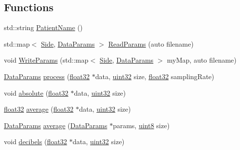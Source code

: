 \subsection*{Functions}
\begin{DoxyCompactItemize}
\item 
std\+::string \hyperlink{namespaceavda_ae20728e7e8ae50bf2f74849e538841ea}{Patient\+Name} ()
\item 
std\+::map$<$ \hyperlink{namespaceavda_af723e82f0d3d45fda6fdc01f6a492786}{Side}, \hyperlink{structDataParams}{Data\+Params} $>$ \hyperlink{namespaceavda_a46dc980b65ddfc24749ce25c1290e158}{Read\+Params} (auto filename)
\item 
void \hyperlink{namespaceavda_aba04a08b41833ced32ec803d55a63bee}{Write\+Params} (std\+::map$<$ \hyperlink{namespaceavda_af723e82f0d3d45fda6fdc01f6a492786}{Side}, \hyperlink{structDataParams}{Data\+Params} $>$ my\+Map, auto filename)
\item 
\hyperlink{structDataParams}{Data\+Params} \hyperlink{namespaceavda_a5196cce27286d08ca144a460caee7839}{process} (\hyperlink{definitions_8hpp_aacdc525d6f7bddb3ae95d5c311bd06a1}{float32} $\ast$data, \hyperlink{definitions_8hpp_a1134b580f8da4de94ca6b1de4d37975e}{uint32} size, \hyperlink{definitions_8hpp_aacdc525d6f7bddb3ae95d5c311bd06a1}{float32} sampling\+Rate)
\item 
void \hyperlink{namespaceavda_aa771d0ed99fc4954c643ea71e91905bf}{absolute} (\hyperlink{definitions_8hpp_aacdc525d6f7bddb3ae95d5c311bd06a1}{float32} $\ast$data, \hyperlink{definitions_8hpp_a1134b580f8da4de94ca6b1de4d37975e}{uint32} size)
\item 
\hyperlink{definitions_8hpp_aacdc525d6f7bddb3ae95d5c311bd06a1}{float32} \hyperlink{namespaceavda_a2a830f24a59aa2538ea82f6e000cce61}{average} (\hyperlink{definitions_8hpp_aacdc525d6f7bddb3ae95d5c311bd06a1}{float32} $\ast$data, \hyperlink{definitions_8hpp_a1134b580f8da4de94ca6b1de4d37975e}{uint32} size)
\item 
\hyperlink{structDataParams}{Data\+Params} \hyperlink{namespaceavda_a87927e04b25012fa7fa0fe05eefce41a}{average} (\hyperlink{structDataParams}{Data\+Params} $\ast$params, \hyperlink{definitions_8hpp_adde6aaee8457bee49c2a92621fe22b79}{uint8} size)
\item 
void \hyperlink{namespaceavda_a9c0b7f832eace3cbc9c5dddea2ecc9d5}{decibels} (\hyperlink{definitions_8hpp_aacdc525d6f7bddb3ae95d5c311bd06a1}{float32} $\ast$data, \hyperlink{definitions_8hpp_a1134b580f8da4de94ca6b1de4d37975e}{uint32} size)
\item 

\end{DoxyCompactItemize}
